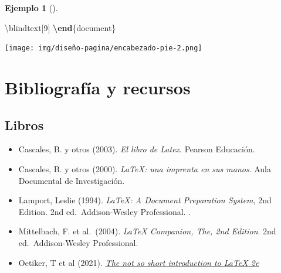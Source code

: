\documentclass[
  a4paper,
]{scrreport}
\newenvironment{Shaded}{\begin{snugshade}}{\end{snugshade}}
\newcommand{\ExtensionTok}[1]{\textcolor[rgb]{0.00,0.23,0.31}{#1}}
\newcommand{\FunctionTok}[1]{\textcolor[rgb]{0.28,0.35,0.67}{#1}}
\newcommand{\KeywordTok}[1]{\textcolor[rgb]{0.00,0.23,0.31}{\textbf{#1}}}
\newcommand{\NormalTok}[1]{\textcolor[rgb]{0.00,0.23,0.31}{#1}}
\providecommand{\tightlist}{%
  \setlength{\itemsep}{0pt}\setlength{\parskip}{0pt}}\usepackage{longtable,booktabs,array}
\theoremstyle{definition}
\newtheorem{example}{Ejemplo}[chapter]
\theoremstyle{remark}
\begin{document}
\begin{example}[]
\begin{Shaded}
\begin{Highlighting}[]
\FunctionTok{\textbackslash{}blindtext}\NormalTok{[9]}
\KeywordTok{\textbackslash{}end}\NormalTok{\{}\ExtensionTok{document}\NormalTok{\}}
\end{Highlighting}
\end{Shaded}

\begin{tcolorbox}[enhanced jigsaw, colframe=quarto-callout-note-color-frame, opacityback=0, title={Salida}, bottomrule=.15mm, left=2mm, coltitle=black, arc=.35mm, leftrule=.75mm, colback=white, rightrule=.15mm, colbacktitle=quarto-callout-note-color!10!white, toprule=.15mm, breakable, opacitybacktitle=0.6, bottomtitle=1mm, toptitle=1mm, titlerule=0mm]

\texttt{[image: img/diseño-pagina/encabezado-pie-2.png]}

\end{tcolorbox}

\end{example}


\chapter*{Bibliografía y recursos}\label{bibliografuxeda-y-recursos}


\section*{Libros}\label{libros}


\begin{itemize}
\tightlist
\item
  Cascales, B. y otros (2003). \emph{El libro de Latex}. Pearson
  Educación.
\item
  Cascales, B. y otros (2000). \emph{LaTeX: una imprenta en sus manos}.
  Aula Documental de Investigación.
\item
  Lamport, Leslie (1994). \emph{LaTeX: A Document Preparation System},
  2nd Edition. 2nd ed.~Addison-Wesley Professional. .
\item
  Mittelbach, F. et al.~(2004). \emph{LaTeX Companion, The, 2nd
  Edition}. 2nd ed.~Addison-Wesley Professional.
\item
  Oetiker, T et al (2021).
  \href{https://tobi.oetiker.ch/lshort/lshort.pdf}{\emph{The not so
  short introduction to LaTeX 2e}}
\end{itemize}
\end{document}
